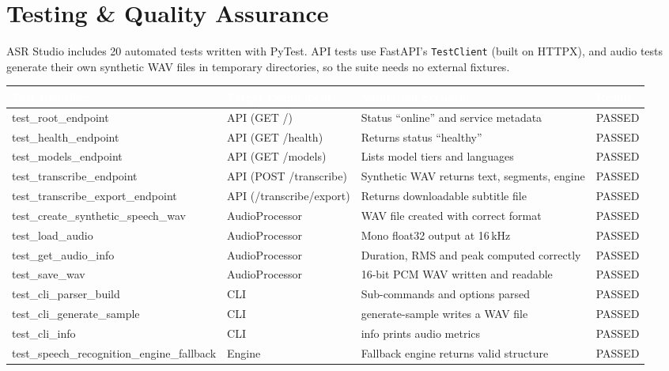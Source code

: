 \documentclass[11pt,a4paper]{article}
\newcommand{\thc}[1]{\textcolor{white}{\bfseries #1}}
\newcommand{\headrow}{\rowcolor{headblue}}
\begin{document}
\clearpage
\section{Testing \& Quality Assurance}
ASR Studio includes 20 automated tests written with PyTest. API tests use FastAPI's \texttt{TestClient} (built on HTTPX), and audio tests generate their own synthetic WAV files in temporary directories, so the suite needs no external fixtures.

\begin{longtable}{|L{4.6cm}|L{3.0cm}|p{6.2cm}|L{1.4cm}|}
\hline
\headrow \thc{Test Identifier} & \thc{Target Component} & \thc{Validation Scenario} & \thc{Result} \\ \hline
\endhead
test\_root\_endpoint & API (GET /) & Status ``online'' and service metadata & PASSED \\ \hline
test\_health\_endpoint & API (GET /health) & Returns status ``healthy'' & PASSED \\ \hline
test\_models\_endpoint & API (GET /models) & Lists model tiers and languages & PASSED \\ \hline
test\_transcribe\_endpoint & API (POST /transcribe) & Synthetic WAV returns text, segments, engine & PASSED \\ \hline
test\_transcribe\_export\_endpoint & API (/transcribe/export) & Returns downloadable subtitle file & PASSED \\ \hline
test\_create\_synthetic\_speech\_wav & AudioProcessor & WAV file created with correct format & PASSED \\ \hline
test\_load\_audio & AudioProcessor & Mono float32 output at 16\,kHz & PASSED \\ \hline
test\_get\_audio\_info & AudioProcessor & Duration, RMS and peak computed correctly & PASSED \\ \hline
test\_save\_wav & AudioProcessor & 16-bit PCM WAV written and readable & PASSED \\ \hline
test\_cli\_parser\_build & CLI & Sub-commands and options parsed & PASSED \\ \hline
test\_cli\_generate\_sample & CLI & generate-sample writes a WAV file & PASSED \\ \hline
test\_cli\_info & CLI & info prints audio metrics & PASSED \\ \hline
test\_speech\_recognition\_engine\_fallback & Engine & Fallback engine returns valid structure & PASSED \\ \hline

\end{longtable}
\end{document}
